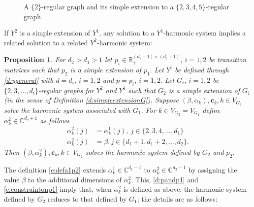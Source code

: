 \documentclass[11pt,a4paper]{article}
\newcommand{\insfig}[3]{
\begin{figure}[h]
\begin{center}
\scalebox{#3}{
\centerline{}}
\end{center}


\vspace{-0.65cm}
\caption{\hspace{0.25cm}#2\label{f:#1}}
\end{figure}
}
\newtheorem{proposition}{Proposition}[section]
\begin{document}
\insfig{simpleextendGtex}{A
$\{2\}$-regular graph and its  simple extension 
to a $\{2,3,4,5\}$-regular graph}{0.8}

If $Y^2$ is a simple
extension of $Y^1$, any solution to a $Y^1$-harmonic system
implies a related solution to a related $Y^2$-harmonic system:
\begin{proposition}\label{p:invarianceundersimpleextensions}
For $d_2 > d_1 > 1$ let 
$p_i \in {\mathbb R}_+^{(d_i + 1) \times (d_i + 1)}$, $i=1,2$ be
transition matrices such that $p_2$ is a simple extension of $p_1.$
Let $Y^i$ be defined through \eqref{d:ygeneral} with $d=d_i$, $i=1,2$
and $p = p_i$, $i=1,2.$
Let $G_i$, $i=1,2$ be
 $\{2,3,...,d_i\}$-regular graphs for $Y^2$ and $Y^1$ such that $G_2$
is a simple extension of $G_1$ (in the sense of Definition \ref{d:simpleextensionG}).
Suppose $(\beta,\alpha_k), {\boldsymbol c}_k, k \in V_{G_1}$
solve the harmonic system associated with $G_1$. 
For $k \in V_{G_2} = V_{G_1}$ define
$\alpha^2_k \in {\mathbb C}^{d_2 + 1}$ as follows
\begin{align}
\label{e:defa1p1}
\alpha^2_k(j)  &= \alpha_k^1(j),~ j\in \{2,3,4,...,d_1\} \\
\label{e:defa1p2}
\alpha^2_k(j)&= \beta, j \in \{d_1+1,d_1+2,...,d_2\}.
\end{align}
Then $(\beta,\alpha^2_k), {\boldsymbol c}_k, k \in V_{G_2}$ 
solves the harmonic system
defined by  $G_2$ and $p_2.$
\end{proposition}
The definition \eqref{e:defa1p2} extends
$\alpha^1_k \in {\mathbb C}^{d_1-1}$ to $\alpha^2_k \in {\mathbb C}^{d_2-1}$
by assigning the value $\beta$
to the additional dimensions of
$\alpha^2_k$.
This, \eqref{d:pandp1} and \eqref{e:constraintonp1} imply that, when
$\alpha^2_k$ is defined as above, the
harmonic system defined by $G_2$ reduces to that defined by $G_1$;
the details are as follows:
\end{document}
